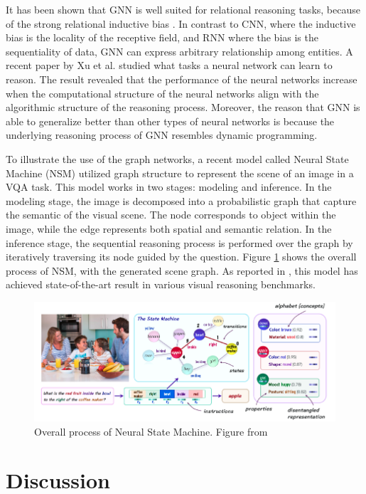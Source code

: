 \documentclass[journal]{IEEEtran}
\begin{document}
It has been shown that GNN is well suited for relational reasoning tasks, because of the strong relational inductive bias \cite{graphnetworks}.
In contrast to CNN, where the inductive bias is the locality of the receptive field, 
and RNN where the bias is the sequentiality of data, GNN can express arbitrary relationship among entities. 
A recent paper by Xu et al. \cite{xu2019can} studied what tasks a neural network can learn to reason. 
The result revealed that the performance of the neural networks increase 
when the computational structure of the neural networks align with the algorithmic structure of the reasoning process. 
Moreover, the reason that GNN is able to generalize better than other types of neural networks is 
because the underlying reasoning process of GNN resembles dynamic programming.

To illustrate the use of the graph networks, a recent model called Neural State Machine (NSM) \cite{hudson2019learning} utilized graph structure to represent the scene of an image in a VQA task.
This model works in two stages: modeling and inference. 
In the modeling stage, the image is decomposed into a probabilistic graph that capture the semantic of the visual scene.
The node corresponds to object within the image, while the edge represents both spatial and semantic relation.
In the inference stage, the sequential reasoning process is performed over the graph by iteratively traversing its node guided by the question.
Figure \ref{nsm} shows the overall process of NSM, with the generated scene graph.
As reported in \cite{hudson2019learning}, this model has achieved state-of-the-art result in various visual reasoning benchmarks.

\begin{figure}[htb]
  \includegraphics[width=\linewidth]{NSM.png}
  \caption{Overall process of Neural State Machine. Figure from \cite{hudson2019learning}}
  \label{nsm}
\end{figure}

\section{Discussion}
\end{document}
